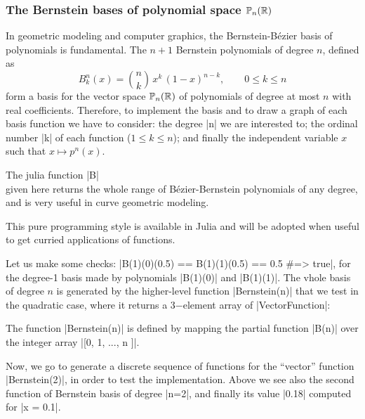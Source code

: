 \subsubsection*{The Bernstein bases of polynomial space $\mathbb{P}_n(\mathbb{R})$}

In geometric modeling and computer graphics, the Bernstein-Bézier basis of polynomials is fundamental. The $n+1$ Bernstein polynomials of degree $n$, defined as
\[
B^n_k(x) = {n \choose k}\,x^k\,(1-x)^{n-k}, \qquad 0\leq k \leq n
\]
form a basis for the vector space $\mathbb{P}_{n}(\mathbb{R})$ of polynomials of degree at most $n$ with real coefficients. Therefore, to implement the basis and to draw a graph of each basis function we have to consider: the degree |n| we are interested to; the ordinal number |k| of each function ($1\leq k\leq n$); and finally the independent variable $x$ such that $x \mapsto p^n(x)$. 

\begin{coding}
The julia function |B| \\ given here returns the whole range of Bézier-Bernstein polynomials of any degree, and is very useful in curve geometric modeling.

This pure programming style is available in Julia and will be adopted when useful to get curried applications of functions. 
\end{coding}


Let us make some checks: |B(1)(0)(0.5) == B(1)(1)(0.5) == 0.5 #=> true|,  for the degree-1 basis  made by polynomials |B(1)(0)| and |B(1)(1)|.  The vhole basis of degree $n$ is generated by the higher-level function |Bernstein(n)| that we test in the quadratic case, where it returns a 3−element array of |Vector{Function}|:
\begin{coding}
The function |Bernstein(n)| is defined by mapping the partial function |B(n)| over the integer array |[0, 1, ..., n ]|. 

\end{coding}


Now, we go to generate a discrete sequence of functions for the “vector” function |Bernstein(2)|, in order to test the implementation. 
Above we see also the second function of Bernstein basis of degree |n=2|, and finally its value |0.18| computed for |x = 0.1|. 

